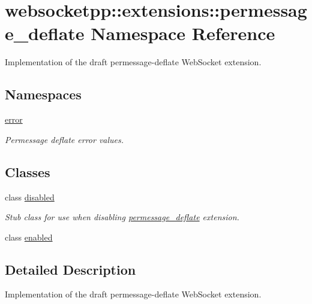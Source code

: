 \hypertarget{namespacewebsocketpp_1_1extensions_1_1permessage__deflate}{}\section{websocketpp\+:\+:extensions\+:\+:permessage\+\_\+deflate Namespace Reference}
\label{namespacewebsocketpp_1_1extensions_1_1permessage__deflate}


Implementation of the draft permessage-\/deflate Web\+Socket extension.  


\subsection*{Namespaces}
\begin{DoxyCompactItemize}
\item 
 \mbox{\hyperlink{namespacewebsocketpp_1_1extensions_1_1permessage__deflate_1_1error}{error}}
\begin{DoxyCompactList}\small\item\em Permessage deflate error values. \end{DoxyCompactList}\end{DoxyCompactItemize}
\subsection*{Classes}
\begin{DoxyCompactItemize}
\item 
class \mbox{\hyperlink{classwebsocketpp_1_1extensions_1_1permessage__deflate_1_1disabled}{disabled}}
\begin{DoxyCompactList}\small\item\em Stub class for use when disabling \mbox{\hyperlink{namespacewebsocketpp_1_1extensions_1_1permessage__deflate}{permessage\+\_\+deflate}} extension. \end{DoxyCompactList}\item 
class \mbox{\hyperlink{classwebsocketpp_1_1extensions_1_1permessage__deflate_1_1enabled}{enabled}}
\end{DoxyCompactItemize}


\subsection{Detailed Description}
Implementation of the draft permessage-\/deflate Web\+Socket extension. 

